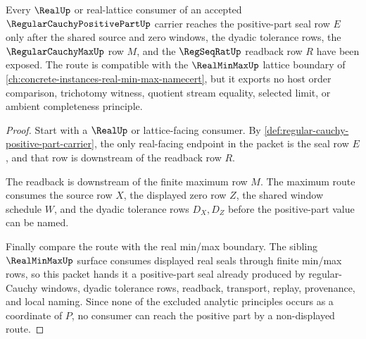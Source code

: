 \begin{theorem}
\label{thm:regular-cauchy-positive-part-real-seal-handoff}
Every $\RealUp$ or real-lattice consumer of an accepted $\RegularCauchyPositivePartUp$ carrier reaches the positive-part seal row $E$ only after the shared source and zero windows, the dyadic tolerance rows, the $\RegularCauchyMaxUp$ row $M$, and the $\RegSeqRatUp$ readback row $R$ have been exposed. The route is compatible with the $\RealMinMaxUp$ lattice boundary of \autoref{ch:concrete-instances-real-min-max-namecert}, but it exports no host order comparison, trichotomy witness, quotient stream equality, selected limit, or ambient completeness principle.
\end{theorem}
\begin{proof}
Start with a $\RealUp$ or lattice-facing consumer. By \autoref{def:regular-cauchy-positive-part-carrier}, the only real-facing endpoint in the packet is the seal row $E$, and that row is downstream of the readback row $R$.

The readback is downstream of the finite maximum row $M$. The maximum route consumes the source row $X$, the displayed zero row $Z$, the shared window schedule $W$, and the dyadic tolerance rows $D_X,D_Z$ before the positive-part value can be named.

Finally compare the route with the real min/max boundary. The sibling $\RealMinMaxUp$ surface consumes displayed real seals through finite min/max rows, so this packet hands it a positive-part seal already produced by regular-Cauchy windows, dyadic tolerance rows, readback, transport, replay, provenance, and local naming. Since none of the excluded analytic principles occurs as a coordinate of $P$, no consumer can reach the positive part by a non-displayed route.
\end{proof}



